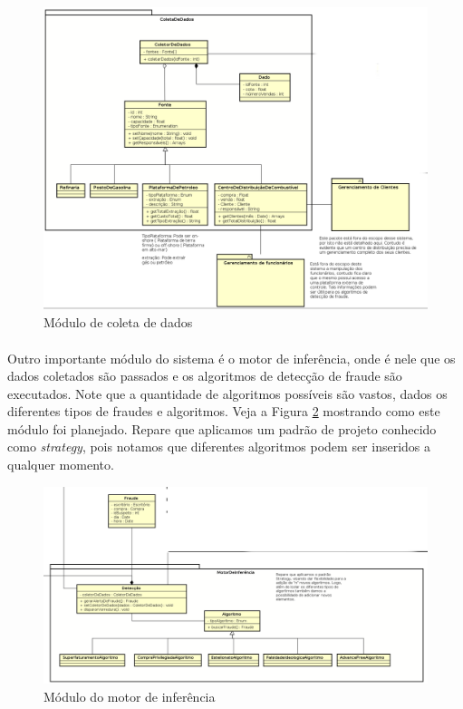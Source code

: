 \documentclass[a4paper,10pt]{article}
\begin{document}
\begin{figure}[ht]
  \centering
  \includegraphics[width=1\textwidth, keepaspectratio=true]{images/coleta.png}
  \caption {Módulo de coleta de dados}
  \label {coleta}
\end{figure}

\paragraph{}
Outro importante módulo do sistema é o motor de inferência, onde é nele que os
dados coletados são passados e os algoritmos de detecção de fraude são
executados. Note que a quantidade de algoritmos possíveis são vastos, dados os
diferentes tipos de fraudes e algoritmos. Veja a Figura \ref{motor} mostrando
como este módulo foi planejado. Repare que aplicamos um padrão de projeto
conhecido como \emph{strategy}, pois notamos que diferentes algoritmos podem
ser inseridos a qualquer momento.

\begin{figure}[ht]
  \centering
  \includegraphics[width=1\textwidth, keepaspectratio=true]{images/motor.png}
  \caption {Módulo do motor de inferência}
  \label {motor}
\end{figure}
\end{document}
